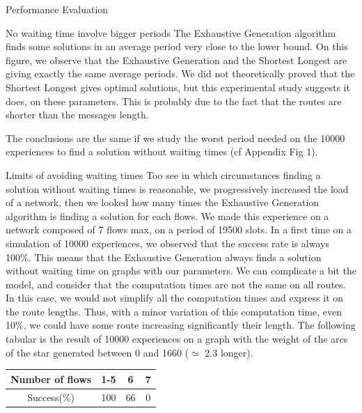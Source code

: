 \documentclass[a4paper,10pt]{report}
\begin{document}
\begin{chapter}{Performance Evaluation}
\begin{section}{No waiting time involve bigger periods}
The Exhaustive Generation algorithm finds some solutions in an average period very close to the lower bound.
On this figure, we observe that the Exhaustive Generation and the Shortest Longest are giving exactly the same average periods.
We did not theoretically proved that the Shortest Longest gives optimal solutions, but this experimental study suggests it does, on these parameters. This is probably due to the fact that the routes are shorter than the messages length.


The conclusions are the same if we study the worst period needed on the 10000 experiences to find a solution without waiting times (cf Appendix Fig 1).
\end{section}

\begin{section}{Limits of avoiding waiting times}
Too see in which circumstances finding a solution without waiting times is reasonable, we progressively increased the load of a network,
then we looked how many times the Exhaustive Generation algorithm is finding a solution for each flows.
We made this experience on a network composed of 7 flows max, on a period of 19500 slots.
In a first time on a simulation of 10000 experiences, we observed that the success rate is always 100\%. This means that the Exhaustive Generation always finds a solution without waiting time on graphs with our parameters.
We can complicate a bit the model, and consider that the computation times are not the same on all routes. 
In this case, we would not simplify all the computation times and express it on the route lengths.
Thus, with a minor variation of this computation time, even 10\%, we could have some route increasing significantly their length. 
The following tabular is the result of 10000 experiences on a graph with the weight of the arcs of the star generated between 0 and 1660 ($\simeq$ 2.3 longer).

\begin{centering}
 


  \begin{tabular}{|c|c|c|c|}
  \hline
   Number of flows & 1-5 & 6 & 7\\
   \hline
   Success(\%) & 100 & 66 & 0\\
   \hline
   \end{tabular}
   

\end{centering}
\end{section}
\end{chapter}
\end{document}
